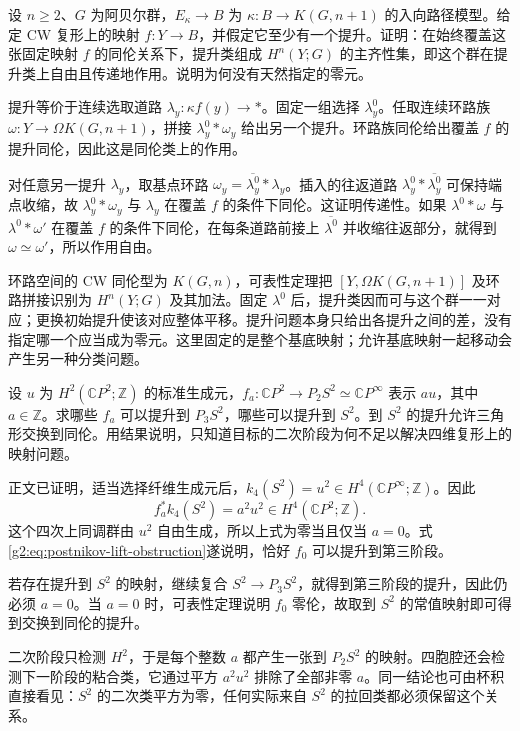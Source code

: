 \begin{exercise}\label{g2:ex:postnikov-lift-torsor}
	设 \(n\ge2\)、\(G\) 为阿贝尔群，\(E_\kappa\to B\) 为 \(\kappa:B\to K(G,n+1)\) 的入向路径模型。给定 CW 复形上的映射 \(f:Y\to B\)，并假定它至少有一个提升。证明：在始终覆盖这张固定映射 \(f\) 的同伦关系下，提升类组成 \(H^n(Y;G)\) 的主齐性集，即这个群在提升类上自由且传递地作用。说明为何没有天然指定的零元。
\end{exercise}
\begin{solution}
	提升等价于连续选取道路 \(\lambda_y:\kappa f(y)\to*\)。固定一组选择 \(\lambda_y^0\)。任取连续环路族 \(\omega:Y\to\Omega K(G,n+1)\)，拼接 \(\lambda_y^0*\omega_y\) 给出另一个提升。环路族同伦给出覆盖 \(f\) 的提升同伦，因此这是同伦类上的作用。

	对任意另一提升 \(\lambda_y\)，取基点环路 \(\omega_y=\overline{\lambda_y^0}*\lambda_y\)。插入的往返道路 \(\lambda_y^0*\overline{\lambda_y^0}\) 可保持端点收缩，故 \(\lambda_y^0*\omega_y\) 与 \(\lambda_y\) 在覆盖 \(f\) 的条件下同伦。这证明传递性。如果 \(\lambda^0*\omega\) 与 \(\lambda^0*\omega'\) 在覆盖 \(f\) 的条件下同伦，在每条道路前接上 \(\overline{\lambda^0}\) 并收缩往返部分，就得到 \(\omega\simeq\omega'\)，所以作用自由。

	环路空间的 CW 同伦型为 \(K(G,n)\)，可表性定理把 \([Y,\Omega K(G,n+1)]\) 及环路拼接识别为 \(H^n(Y;G)\) 及其加法。固定 \(\lambda^0\) 后，提升类因而可与这个群一一对应；更换初始提升使该对应整体平移。提升问题本身只给出各提升之间的差，没有指定哪一个应当成为零元。这里固定的是整个基底映射；允许基底映射一起移动会产生另一种分类问题。
\end{solution}

\begin{exercise}\label{g2:ex:postnikov-cp-two-sphere-lift}
	设 \(u\) 为 \(H^2(\mathbb CP^2;\mathbb Z)\) 的标准生成元，\(f_a:\mathbb CP^2\to P_2S^2\simeq\mathbb CP^\infty\) 表示 \(a u\)，其中 \(a\in\mathbb Z\)。求哪些 \(f_a\) 可以提升到 \(P_3S^2\)，哪些可以提升到 \(S^2\)。到 \(S^2\) 的提升允许三角形交换到同伦。用结果说明，只知道目标的二次阶段为何不足以解决四维复形上的映射问题。
\end{exercise}
\begin{solution}
	正文已证明，适当选择纤维生成元后，\(k_4(S^2)=u^2\in H^4(\mathbb CP^\infty;\mathbb Z)\)。因此
	\[
		f_a^*k_4(S^2)=a^2u^2\in H^4(\mathbb CP^2;\mathbb Z).
	\]
	这个四次上同调群由 \(u^2\) 自由生成，所以上式为零当且仅当 \(a=0\)。式\eqref{g2:eq:postnikov-lift-obstruction}遂说明，恰好 \(f_0\) 可以提升到第三阶段。

	若存在提升到 \(S^2\) 的映射，继续复合 \(S^2\to P_3S^2\)，就得到第三阶段的提升，因此仍必须 \(a=0\)。当 \(a=0\) 时，可表性定理说明 \(f_0\) 零伦，故取到 \(S^2\) 的常值映射即可得到交换到同伦的提升。

	二次阶段只检测 \(H^2\)，于是每个整数 \(a\) 都产生一张到 \(P_2S^2\) 的映射。四胞腔还会检测下一阶段的粘合类，它通过平方 \(a^2u^2\) 排除了全部非零 \(a\)。同一结论也可由杯积直接看见：\(S^2\) 的二次类平方为零，任何实际来自 \(S^2\) 的拉回类都必须保留这个关系。
\end{solution}

